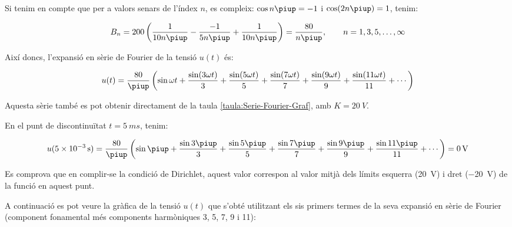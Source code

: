 \begin{exemple}
    Si tenim en compte que per a valors senars de l'índex $n$, es
    compleix: $\cos n \piup = -1$ i $\cos (2 n \piup) = 1$, tenim:

    \[
        B_n = 200 \left( \frac{1}{10 n \piup} - \frac{-1}{5 n \piup} +
        \frac{1}{10 n \piup} \right) = \frac{80}{n \piup},
        \qquad n=1,3,5,\ldots,\infty
    \]

    Així doncs, l'expansió en sèrie de Fourier de la tensió $u(t)$ és:

    \[
        u(t) = \frac{80}{\piup} \left( \sin \omega t + \frac{\sin (3 \omega t)}{3} +
        \frac{\sin (5 \omega t)}{5} + \frac{\sin (7 \omega t)}{7} +
        \frac{\sin (9 \omega t)}{9} + \frac{\sin (11 \omega t)}{11} +\cdots\right)
    \]

    Aquesta sèrie també es pot obtenir directament de la taula \vref{taula:Serie-Fourier-Graf}, amb $K=\qty{20}{V}$.

    En el punt de discontinuïtat $t=\qty{5}{ms}$, tenim:

    \[
        u(\qty{5e-3}{s}) =\frac{80}{\piup} \left( \sin \piup + \frac{\sin 3 \piup}{3} +
        \frac{\sin 5 \piup}{5} + \frac{\sin 7 \piup}{7} +
        \frac{\sin 9 \piup}{9} +\frac{\sin 11 \piup}{11}+\cdots\right) = \qty{0}{V}
    \]

    Es comprova que en complir-se la condició de Dirichlet, aquest valor
    correspon al valor mitjà dels límits esquerra (\qty{20}{V}) i dret (\qty{-20}{V})  de
    la funció en aquest punt.

    A continuació es pot veure la gràfica de la tensió $u(t)$ que
    s'obté utilitzant els sis primers termes de la seva expansió en sèrie de Fourier (component fonamental més components harmòniques 3, 5, 7, 9 i 11):

    \begin{center}
        
    \end{center}


\end{exemple}
